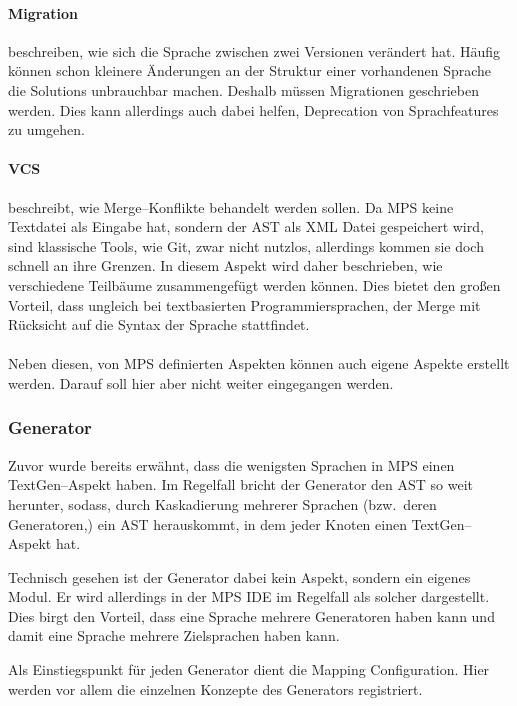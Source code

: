 \paragraph{Migration} beschreiben, wie sich die Sprache zwischen zwei Versionen verändert hat.
Häufig können schon kleinere Änderungen an der Struktur einer vorhandenen Sprache die Solutions unbrauchbar machen.
Deshalb müssen Migrationen geschrieben werden.
Dies kann allerdings auch dabei helfen, Deprecation von Sprachfeatures zu umgehen.

\paragraph{\ac{VCS}} beschreibt, wie Merge--Konflikte behandelt werden sollen.
Da \ac{MPS} keine Textdatei als Eingabe hat, sondern der \ac{AST} als XML Datei gespeichert wird, sind klassische Tools, wie Git, zwar nicht nutzlos, allerdings kommen sie doch schnell an ihre Grenzen.
In diesem Aspekt wird daher beschrieben, wie verschiedene Teilbäume zusammengefügt werden können.
Dies bietet den großen Vorteil, dass ungleich bei textbasierten Programmiersprachen, der Merge mit Rücksicht auf die Syntax der Sprache stattfindet.

\paragraph*{}
Neben diesen, von \ac{MPS} definierten Aspekten können auch eigene Aspekte erstellt werden.
Darauf soll hier aber nicht weiter eingegangen werden.

\subsubsection{Generator}
Zuvor wurde bereits erwähnt, dass die wenigsten Sprachen in \ac{MPS} einen TextGen--Aspekt haben.
Im Regelfall bricht der Generator den \ac{AST} so weit herunter, sodass, durch Kaskadierung mehrerer Sprachen (bzw.\ deren Generatoren,) ein \ac{AST} herauskommt, in dem jeder Knoten einen TextGen--Aspekt hat.

Technisch gesehen ist der Generator dabei kein Aspekt, sondern ein eigenes Modul.
Er wird allerdings in der \ac{MPS} \ac{IDE} im Regelfall als solcher dargestellt.
Dies birgt den Vorteil, dass eine Sprache mehrere Generatoren haben kann und damit eine Sprache mehrere Zielsprachen haben kann.

Als Einstiegspunkt für jeden Generator dient die {\ttfamily Mapping Configuration}.
Hier werden vor allem die einzelnen Konzepte des Generators registriert.


